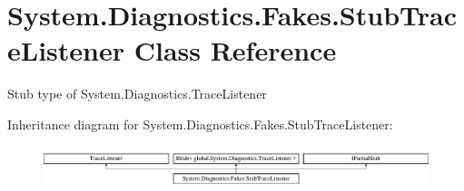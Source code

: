 \hypertarget{class_system_1_1_diagnostics_1_1_fakes_1_1_stub_trace_listener}{\section{System.\-Diagnostics.\-Fakes.\-Stub\-Trace\-Listener Class Reference}
\label{class_system_1_1_diagnostics_1_1_fakes_1_1_stub_trace_listener}
}


Stub type of System.\-Diagnostics.\-Trace\-Listener 


Inheritance diagram for System.\-Diagnostics.\-Fakes.\-Stub\-Trace\-Listener\-:\begin{figure}[H]
\begin{center}
\leavevmode
\includegraphics[height=1.240310cm]{class_system_1_1_diagnostics_1_1_fakes_1_1_stub_trace_listener}
\end{center}
\end{figure}
